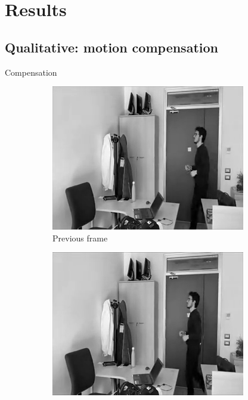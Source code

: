 \documentclass[aspectratio=1610,xcolor=dvipsnames]{beamer}
\begin{document}
\section{Results}
\subsection{Qualitative: motion compensation}
\begin{frame}{Compensation}
    \begin{figure}[htbp]
        \begin{subfigure}[b]{0.3\textwidth}
            \centering
            \includegraphics[width=.9\textwidth]{../assets/images/04-prev-frame.png}
            \caption{Previous frame}
            \label{fig:prev-frame}
        \end{subfigure}
        \hfill
        \begin{subfigure}[b]{0.3\textwidth}
            \includegraphics[width=.9\textwidth]{../assets/images/04-curr-frame.png}

\end{subfigure}
\end{figure}
\end{frame}
\end{document}
